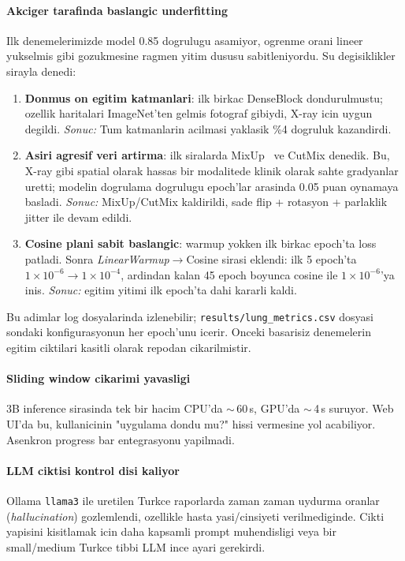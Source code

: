 \documentclass[conference]{IEEEtran}
\begin{document}
\paragraph{Akciger tarafinda baslangic underfitting}
Ilk denemelerimizde model 0.85 dogrulugu asamiyor, ogrenme orani lineer
yukselmis gibi gozukmesine ragmen yitim dususu sabitleniyordu. Su degisiklikler
sirayla denedi:
\begin{enumerate}
  \item \textbf{Donmus on egitim katmanlari}: ilk birkac DenseBlock dondurulmustu;
        ozellik haritalari ImageNet'ten gelmis fotograf gibiydi, X-ray icin
        uygun degildi. \emph{Sonuc:} Tum katmanlarin acilmasi yaklasik
        \%4 dogruluk kazandirdi.
  \item \textbf{Asiri agresif veri artirma}: ilk siralarda MixUp~\cite{zhang2018mixup}
        ve CutMix denedik. Bu, X-ray gibi spatial olarak hassas bir modalitede
        klinik olarak sahte gradyanlar uretti; modelin dogrulama dogrulugu
        epoch'lar arasinda 0.05 puan oynamaya basladi. \emph{Sonuc:} MixUp/CutMix
        kaldirildi, sade flip + rotasyon + parlaklik jitter ile devam edildi.
  \item \textbf{Cosine plani sabit baslangic}: warmup yokken ilk birkac
        epoch'ta loss patladi. Sonra \emph{LinearWarmup}$\!\rightarrow\!$Cosine
        sirasi eklendi: ilk 5 epoch'ta $1\!\times\!10^{-6}\!\rightarrow\!1\!\times\!10^{-4}$,
        ardindan kalan 45 epoch boyunca cosine ile $1\!\times\!10^{-6}$'ya
        inis. \emph{Sonuc:} egitim yitimi ilk epoch'ta dahi kararli kaldi.
\end{enumerate}

Bu adimlar log dosyalarinda izlenebilir; \texttt{results/lung\_metrics.csv}
dosyasi sondaki konfigurasyonun her epoch'unu icerir. Onceki basarisiz
denemelerin egitim ciktilari kasitli olarak repodan cikarilmistir.

\paragraph{Sliding window cikarimi yavasligi}
3B inference sirasinda tek bir hacim CPU'da $\sim$\,60\,s, GPU'da $\sim$\,4\,s
suruyor. Web UI'da bu, kullanicinin "uygulama dondu mu?" hissi vermesine yol
acabiliyor. Asenkron progress bar entegrasyonu yapilmadi.

\paragraph{LLM ciktisi kontrol disi kaliyor}
Ollama \texttt{llama3} ile uretilen Turkce raporlarda zaman zaman uydurma
oranlar (\emph{hallucination}) gozlemlendi, ozellikle hasta yasi/cinsiyeti
verilmediginde. Cikti yapisini kisitlamak icin daha kapsamli prompt
muhendisligi veya bir small/medium Turkce tibbi LLM ince ayari gerekirdi.
\end{document}
